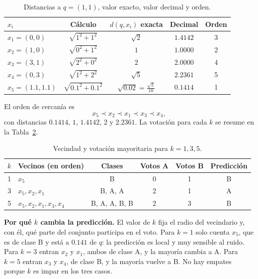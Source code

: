 \documentclass[12pt,a4paper]{article}
\begin{document}
\begin{table}[H]
  \centering
  \small
  \caption{Distancias a $q=(1,1)$, valor exacto, valor decimal y orden.}
  \label{tab:distancias}
  \begin{tabular}{@{}lcccc@{}}
    \toprule
    $x_i$ & Cálculo & $d(q,x_i)$ exacta & Decimal & Orden \\
    \midrule
    $x_1=(0,0)$     & $\sqrt{1^2+1^2}$   & $\sqrt{2}$        & $1.4142$ & 3 \\
    $x_2=(1,0)$     & $\sqrt{0^2+1^2}$   & $1$               & $1.0000$ & 2 \\
    $x_3=(3,1)$     & $\sqrt{2^2+0^2}$   & $2$               & $2.0000$ & 4 \\
    $x_4=(0,3)$     & $\sqrt{1^2+2^2}$   & $\sqrt{5}$        & $2.2361$ & 5 \\
    $x_5=(1.1,1.1)$ & $\sqrt{0.1^2+0.1^2}$ & $\sqrt{0.02}=\frac{\sqrt{2}}{10}$ & $0.1414$ & 1 \\
    \bottomrule
  \end{tabular}
\end{table}

El orden de cercanía es
\begin{equation}
  x_5 \prec x_2 \prec x_1 \prec x_3 \prec x_4,
\end{equation}
con distancias $0.1414$, $1$, $1.4142$, $2$ y $2.2361$. La votación para cada
$k$ se resume en la Tabla~\ref{tab:votos}.

\begin{table}[H]
  \centering
  \small
  \caption{Vecindad y votación mayoritaria para $k=1,3,5$.}
  \label{tab:votos}
  \begin{tabular}{@{}clcccc@{}}
    \toprule
    $k$ & Vecinos (en orden) & Clases & Votos A & Votos B & Predicción \\
    \midrule
    1 & $x_5$                 & B             & 0 & 1 & B \\
    3 & $x_5,x_2,x_1$         & B, A, A       & 2 & 1 & A \\
    5 & $x_5,x_2,x_1,x_3,x_4$ & B, A, A, B, B & 2 & 3 & B \\
    \bottomrule
  \end{tabular}
\end{table}

\textbf{Por qué $k$ cambia la predicción.} El valor de $k$ fija el radio del
vecindario y, con él, qué parte del conjunto participa en el voto. Para $k=1$
solo cuenta $x_5$, que es de clase B y está a $0.141$ de $q$: la predicción es
local y muy sensible al ruido. Para $k=3$ entran $x_2$ y $x_1$, ambos de clase
A, y la mayoría cambia a A. Para $k=5$ entran $x_3$ y $x_4$, de clase B, y la
mayoría vuelve a B. No hay empates porque $k$ es impar en los tres casos.
\end{document}
